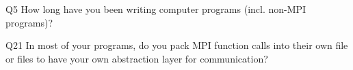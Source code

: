 \begin{description}%
\item{Q5} How long have you been writing computer programs (incl. non-MPI programs)?%
\item{Q21} In most of your programs, do you pack MPI function calls into their own file or files to have your own abstraction layer for communication?%
\end{description}%
